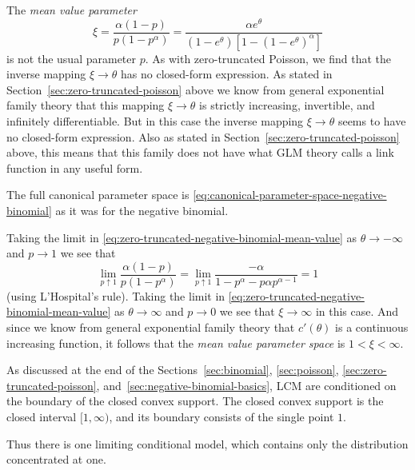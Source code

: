 The \emph{mean value parameter}
\begin{equation} \label{eq:zero-truncated-negative-binomial-mean-value}
   \xi
   =
   \frac{\alpha (1 - p)}{p (1 - p^\alpha)}
   =
   \frac{\alpha e^\theta}{(1 - e^\theta) [1 - (1 - e^\theta)^\alpha]}
\end{equation}
is not the usual parameter $p$.  As with zero-truncated Poisson,
we find that the inverse mapping $\xi \to \theta$ has no closed-form
expression.
As stated in Section~\ref{sec:zero-truncated-poisson} above
we know from general exponential family theory
that this mapping $\xi \to \theta$ is
strictly increasing, invertible, and infinitely differentiable.
But in this case the inverse mapping $\xi \to \theta$ seems to have
no closed-form expression.
Also as stated in Section~\ref{sec:zero-truncated-poisson} above,
this means that this family does not have what GLM theory calls a link function
in any useful form.

The full canonical parameter space is
\eqref{eq:canonical-parameter-space-negative-binomial}
as it was for the negative binomial.

Taking the limit in
\eqref{eq:zero-truncated-negative-binomial-mean-value}
as $\theta \to - \infty$ and $p \to 1$ we see that
$$
   \lim_{p \uparrow 1} \frac{\alpha (1 - p)}{p (1 - p^\alpha)}
   =
   \lim_{p \uparrow 1} \frac{- \alpha}{1 - p^\alpha - p \alpha p^{\alpha - 1}}
   =
   1
$$
(using L'Hospital's rule).
Taking the limit in
\eqref{eq:zero-truncated-negative-binomial-mean-value}
as $\theta \to \infty$ and $p \to 0$ we see that $\xi \to \infty$ in
this case.  And since we know from general exponential family theory
that $c'(\theta)$ is a continuous increasing function, it follows
that the \emph{mean value parameter space} is $1 < \xi < \infty$.

As discussed at the end of the Sections~\ref{sec:binomial},
\ref{sec:poisson}, \ref{sec:zero-truncated-poisson},
and~\ref{sec:negative-binomial-basics},
LCM are conditioned on the boundary of the closed convex support.
The closed convex support is the closed interval $[1, \infty)$, and its
boundary consists of the single point $1$.

Thus there is one limiting conditional model, which contains only
the distribution concentrated at one.

